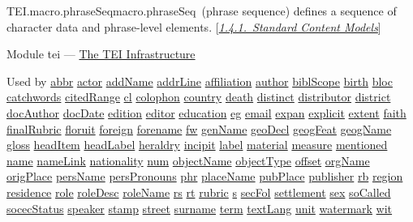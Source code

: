 \begin{reflist}
\item[]\begin{specHead}{TEI.macro.phraseSeq}{macro.phraseSeq} (phrase sequence) defines a sequence of character data and phrase-level elements. [\textit{\hyperref[STECST]{1.4.1.\ Standard Content Models}}]\end{specHead} 
    \item[{Module}]
  tei — \hyperref[ST]{The TEI Infrastructure}
    \item[{Used by}]
  \hyperref[TEI.abbr]{abbr} \hyperref[TEI.actor]{actor} \hyperref[TEI.addName]{addName} \hyperref[TEI.addrLine]{addrLine} \hyperref[TEI.affiliation]{affiliation} \hyperref[TEI.author]{author} \hyperref[TEI.biblScope]{biblScope} \hyperref[TEI.birth]{birth} \hyperref[TEI.bloc]{bloc} \hyperref[TEI.catchwords]{catchwords} \hyperref[TEI.citedRange]{citedRange} \hyperref[TEI.cl]{cl} \hyperref[TEI.colophon]{colophon} \hyperref[TEI.country]{country} \hyperref[TEI.death]{death} \hyperref[TEI.distinct]{distinct} \hyperref[TEI.distributor]{distributor} \hyperref[TEI.district]{district} \hyperref[TEI.docAuthor]{docAuthor} \hyperref[TEI.docDate]{docDate} \hyperref[TEI.edition]{edition} \hyperref[TEI.editor]{editor} \hyperref[TEI.education]{education} \hyperref[TEI.eg]{eg} \hyperref[TEI.email]{email} \hyperref[TEI.expan]{expan} \hyperref[TEI.explicit]{explicit} \hyperref[TEI.extent]{extent} \hyperref[TEI.faith]{faith} \hyperref[TEI.finalRubric]{finalRubric} \hyperref[TEI.floruit]{floruit} \hyperref[TEI.foreign]{foreign} \hyperref[TEI.forename]{forename} \hyperref[TEI.fw]{fw} \hyperref[TEI.genName]{genName} \hyperref[TEI.geoDecl]{geoDecl} \hyperref[TEI.geogFeat]{geogFeat} \hyperref[TEI.geogName]{geogName} \hyperref[TEI.gloss]{gloss} \hyperref[TEI.headItem]{headItem} \hyperref[TEI.headLabel]{headLabel} \hyperref[TEI.heraldry]{heraldry} \hyperref[TEI.incipit]{incipit} \hyperref[TEI.label]{label} \hyperref[TEI.material]{material} \hyperref[TEI.measure]{measure} \hyperref[TEI.mentioned]{mentioned} \hyperref[TEI.name]{name} \hyperref[TEI.nameLink]{nameLink} \hyperref[TEI.nationality]{nationality} \hyperref[TEI.num]{num} \hyperref[TEI.objectName]{objectName} \hyperref[TEI.objectType]{objectType} \hyperref[TEI.offset]{offset} \hyperref[TEI.orgName]{orgName} \hyperref[TEI.origPlace]{origPlace} \hyperref[TEI.persName]{persName} \hyperref[TEI.persPronouns]{persPronouns} \hyperref[TEI.phr]{phr} \hyperref[TEI.placeName]{placeName} \hyperref[TEI.pubPlace]{pubPlace} \hyperref[TEI.publisher]{publisher} \hyperref[TEI.rb]{rb} \hyperref[TEI.region]{region} \hyperref[TEI.residence]{residence} \hyperref[TEI.role]{role} \hyperref[TEI.roleDesc]{roleDesc} \hyperref[TEI.roleName]{roleName} \hyperref[TEI.rs]{rs} \hyperref[TEI.rt]{rt} \hyperref[TEI.rubric]{rubric} \hyperref[TEI.s]{s} \hyperref[TEI.secFol]{secFol} \hyperref[TEI.settlement]{settlement} \hyperref[TEI.sex]{sex} \hyperref[TEI.soCalled]{soCalled} \hyperref[TEI.socecStatus]{socecStatus} \hyperref[TEI.speaker]{speaker} \hyperref[TEI.stamp]{stamp} \hyperref[TEI.street]{street} \hyperref[TEI.surname]{surname} \hyperref[TEI.term]{term} \hyperref[TEI.textLang]{textLang} \hyperref[TEI.unit]{unit} \hyperref[TEI.watermark]{watermark} \hyperref[TEI.wit]{wit}

\end{reflist}
